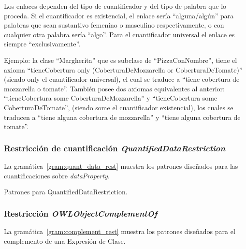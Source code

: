 Los enlaces dependen del tipo de cuantificador y del tipo de palabra que lo proceda. Si el cuantificador es existencial, el enlace sería ``alguna/algún'' para palabras que sean sustantivo femenino o masculino respectivamente, o con cualquier otra palabra sería ``algo''.  Para el cuantificador universal el enlace es siempre ``exclusivamente''.

Ejemplo: la clase ``Margherita'' que es subclase de ``PizzaConNombre'', tiene el axioma ``tieneCobertura only 
    (CoberturaDeMozzarella or CoberturaDeTomate)'' (siendo only el cuantificador universal), el cual se traduce a ``tiene cobertura de mozzarella o tomate''. También posee dos axiomas equivalentes al anterior: ``tieneCobertura some CoberturaDeMozzarella'' y ``tieneCobertura some CoberturaDeTomate'', (siendo some el cuantificador existencial), los cuales se traducen a ``tiene alguna cobertura de mozzarella'' y ``tiene alguna cobertura de tomate''.


\subsubsection{Restricción de cuantificación \emph{QuantifiedDataRestriction}}
La gramática~\ref{gram:quant_data_rest} muestra los patrones diseñados para las cuantificaciones sobre \emph{dataProperty}.

\begin{GrammarEnv}
\begin{grammar}
\end{grammar}
\caption{Patrones para QuantifiedDataRestriction.}\label{gram:quant_data_rest}
\end{GrammarEnv}

\subsubsection{Restricción \emph{OWLObjectComplementOf}}
La gramática~\ref{gram:complement_rest} muestra los patrones diseñados para el complemento de una Expresión de Clase.

